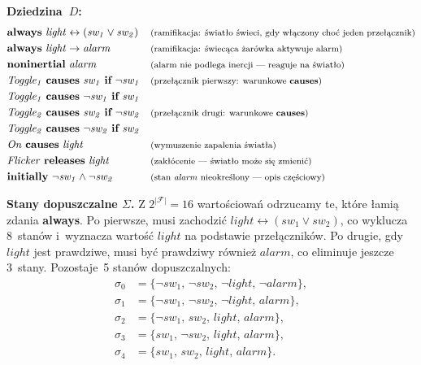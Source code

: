 \documentclass[11pt,a4paper]{article}
\newcommand{\causes}{\textbf{causes}}
\renewcommand{\iff}{\textbf{if}}
\newcommand{\initially}{\textbf{initially}}
\newcommand{\always}{\textbf{always}}
\newcommand{\releases}{\textbf{releases}}
\newcommand{\noninertial}{\textbf{noninertial}}
\newcommand{\cmt}[1]{\text{\footnotesize\normalfont (#1)}}
\theoremstyle{definition}
\begin{document}
\medskip
\noindent\textbf{Dziedzina~$D$:}
{\small
\begin{align*}
  &\always\ \mathit{light} \leftrightarrow (\mathit{sw_1} \lor \mathit{sw_2})
    && \cmt{ramifikacja: światło świeci, gdy włączony choć jeden przełącznik} \\
  &\always\ \mathit{light} \to \mathit{alarm}
    && \cmt{ramifikacja: świecąca żarówka aktywuje alarm} \\
  &\noninertial\ \mathit{alarm}
    && \cmt{alarm nie podlega inercji --- reaguje na światło} \\
  &\mathit{Toggle_1}\ \causes\ \mathit{sw_1}\ \iff\ \neg\mathit{sw_1}
    && \cmt{przełącznik pierwszy: warunkowe \causes{}} \\
  &\mathit{Toggle_1}\ \causes\ \neg\mathit{sw_1}\ \iff\ \mathit{sw_1} \\
  &\mathit{Toggle_2}\ \causes\ \mathit{sw_2}\ \iff\ \neg\mathit{sw_2}
    && \cmt{przełącznik drugi: warunkowe \causes{}} \\
  &\mathit{Toggle_2}\ \causes\ \neg\mathit{sw_2}\ \iff\ \mathit{sw_2} \\
  &\mathit{On}\ \causes\ \mathit{light}
    && \cmt{wymuszenie zapalenia światła} \\
  &\mathit{Flicker}\ \releases\ \mathit{light}
    && \cmt{zakłócenie --- światło może się zmienić} \\
  &\initially\ \neg\mathit{sw_1} \land \neg\mathit{sw_2}
    && \cmt{stan \textit{alarm} nieokreślony --- opis częściowy}
\end{align*}
}

\medskip
\noindent\textbf{Stany dopuszczalne $\Sigma$.}
Z $2^{|\mathcal{F}|}=16$ wartościowań odrzucamy te, które łamią zdania \always{}.
Po pierwsze, musi zachodzić $\mathit{light} \leftrightarrow (\mathit{sw_1} \lor \mathit{sw_2})$,
co wyklucza 8~stanów i~wyznacza wartość $\mathit{light}$ na podstawie przełączników.
Po drugie, gdy $\mathit{light}$ jest prawdziwe, musi być prawdziwy również $\mathit{alarm}$,
co eliminuje jeszcze 3~stany. Pozostaje~5 stanów dopuszczalnych:
\begin{align*}
  \sigma_0 &= \{\neg\mathit{sw_1},\, \neg\mathit{sw_2},\, \neg\mathit{light},\, \neg\mathit{alarm}\}, \\
  \sigma_1 &= \{\neg\mathit{sw_1},\, \neg\mathit{sw_2},\, \neg\mathit{light},\, \mathit{alarm}\}, \\
  \sigma_2 &= \{\neg\mathit{sw_1},\, \mathit{sw_2},\, \mathit{light},\, \mathit{alarm}\}, \\
  \sigma_3 &= \{\mathit{sw_1},\, \neg\mathit{sw_2},\, \mathit{light},\, \mathit{alarm}\}, \\
  \sigma_4 &= \{\mathit{sw_1},\, \mathit{sw_2},\, \mathit{light},\, \mathit{alarm}\}.
\end{align*}
\end{document}
